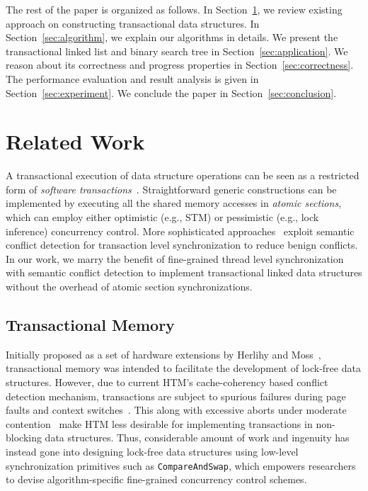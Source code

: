 \documentclass[10pt,conference,compsocconf]{IEEEtran}
\begin{document}
The rest of the paper is organized as follows. 
In Section~\ref{sec:related}, we review existing approach on constructing transactional data structures.
In Section~\ref{sec:algorithm}, we explain our algorithms in details.
We present the transactional linked list and binary search tree in Section~\ref{sec:application}.
We reason about its correctness and progress properties in Section~\ref{sec:correctness}.
The performance evaluation and result analysis is given in Section~\ref{sec:experiment}.
We conclude the paper in Section~\ref{sec:conclusion}.

\section{Related Work}
\label{sec:related}
A transactional execution of data structure operations can be seen as a restricted form of \emph{software transactions}~\cite{harris2010transactional}.
Straightforward generic constructions can be implemented by executing all the shared memory accesses in \emph{atomic sections}, which can employ either optimistic (e.g., STM) or pessimistic (e.g., lock inference) concurrency control.
More sophisticated approaches~\cite{bronson2010transactional,herlihy2008transactional,golan2015automatic} exploit semantic conflict detection for transaction level synchronization to reduce benign conflicts.
In our work, we marry the benefit of fine-grained thread level synchronization with semantic conflict detection to implement transactional linked data structures without the overhead of atomic section synchronizations.

\subsection{Transactional Memory}
Initially proposed as a set of hardware extensions by Herlihy and Moss~\cite{herlihy1993transactional}, transactional memory was intended to facilitate the development of lock-free data structures.
However, due to current HTM's cache-coherency based conflict detection mechanism, transactions are subject to spurious failures during page faults and context switches~\cite{dice2009early}.
This along with excessive aborts under moderate contention~\cite{christina2015resource} make HTM less desirable for implementing transactions in non-blocking data structures.
Thus, considerable amount of work and ingenuity has instead gone into designing lock-free data structures using low-level synchronization primitives such as \texttt{CompareAndSwap}, which empowers researchers to devise algorithm-specific fine-grained concurrency control schemes.
\end{document}

